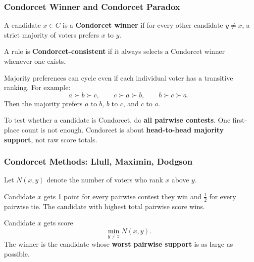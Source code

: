 \separator

\subsubsection{Condorcet Winner and Condorcet Paradox}

\begin{defbox}
A candidate $x \in C$ is a \textbf{Condorcet winner} if for every other candidate $y \neq x$, a strict majority of voters prefers $x$ to $y$.
\end{defbox}

\begin{defbox}
A rule is \textbf{Condorcet-consistent} if it always selects a Condorcet winner whenever one exists.
\end{defbox}

\begin{defbox}
Majority preferences can cycle even if each individual voter has a transitive ranking. For example:
\[
  a \succ b \succ c,\qquad
  c \succ a \succ b,\qquad
  b \succ c \succ a.
\]
Then the majority prefers $a$ to $b$, $b$ to $c$, and $c$ to $a$.
\end{defbox}

\begin{tipbox}
To test whether a candidate is Condorcet, do \textbf{all pairwise contests}. One first-place count is not enough. Condorcet is about \textbf{head-to-head majority support}, not raw score totals.
\end{tipbox}

\separator

\subsubsection{Condorcet Methods: Llull, Maximin, Dodgson}

Let $N(x,y)$ denote the number of voters who rank $x$ above $y$.

\begin{defbox}
Candidate $x$ gets 1 point for every pairwise contest they win and $\frac{1}{2}$ for every pairwise tie. The candidate with highest total pairwise score wins.
\end{defbox}

\begin{defbox}
Candidate $x$ gets score
\[
  \min_{y \neq x} N(x,y).
\]
The winner is the candidate whose \textbf{worst pairwise support} is as large as possible.
\end{defbox}

